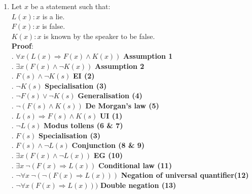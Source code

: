 \documentclass[a4paper]{article}
\begin{document}
\begin{enumerate}
\item \indent\indent Let \(x\) be a statement such that:\\
\vspace{1mm}
\indent\indent \(L(x) : x\) is a lie.\\
\indent\indent \(F(x) : x\) is false.\\
\indent\indent \(K(x) : x\) is known by the speaker to be false.\\
\vspace{2mm}
\indent\indent \textbf{Proof}:\\
\vspace{2mm}
\indent{}. \( \forall x (L(x) \Rightarrow F(x) \wedge K(x))\) \hfill \textbf{Assumption 1}\\
\indent{}. \( \exists x (F(x) \wedge \neg K(x))\) \hfill \textbf{Assumption 2}\\
\indent{}. \( F(s) \wedge \neg K(s)\) \hfill \textbf{EI (2)}\\
\indent{}. \( \neg K(s) \) \hfill \textbf{Specialisation (3)}\\
\indent{}. \( \neg F(s) \vee \neg K(s) \) \hfill \textbf{Generalisation (4)}\\
\indent{}. \( \neg (F(s) \wedge K(s)) \) \hfill \textbf{De Morgan's law (5)}\\
\indent{}. \( L(s) \Rightarrow F(s) \wedge K(s)\) \hfill \textbf{UI (1)}\\
\indent{}. \( \neg L(s) \) \hfill \textbf{Modus tollens (6 \& 7)}\\
\indent{}. \( F(s) \) \hfill \textbf{Specialisation (3)}\\
\indent{}. \( F(s) \wedge \neg L(s) \) \hfill \textbf{Conjunction (8 \& 9)}\\
\indent{}. \( \exists x(F(x) \wedge \neg L(x))\) \hfill \textbf{EG (10)}\\
\indent{}. \( \exists x~\neg(F(x) \Rightarrow L(x))\) \hfill \textbf{Conditional law (11)}\\
\indent{}. \( \neg \forall x~\neg(\neg(F(x) \Rightarrow L(x)))\) \hfill \textbf{Negation of universal quantifier(12)}\\
\indent{}. \( \neg \forall x(F(x) \Rightarrow L(x)))\) \hfill \textbf{Double negation (13)}\\

\end{enumerate}
\end{document}
